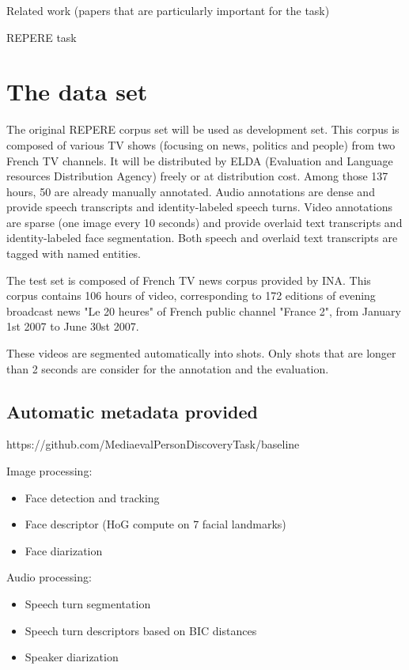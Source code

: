 \documentclass{acm_proc_article-me}
\begin{document}
Related work (papers that are particularly important for the task)

REPERE task


\section{The data set}

The original REPERE corpus set will be used as development set. This corpus is composed of various TV shows (focusing on news, politics and people) from two French TV channels. It will be distributed by ELDA (Evaluation and Language resources Distribution Agency) freely or at distribution cost. Among those 137 hours, 50 are already manually annotated. Audio annotations are dense and provide speech transcripts and identity-labeled speech turns. Video annotations are sparse (one image every 10 seconds) and provide overlaid text transcripts and identity-labeled face segmentation. Both speech and overlaid text transcripts are tagged with named entities.

The test set is composed of French TV news corpus provided by INA. This corpus contains 106 hours of video, corresponding to 172 editions of evening broadcast news "Le 20 heures" of French public channel "France 2", from January 1st 2007 to June 30st 2007.

These videos are segmented automatically into shots. Only shots that are longer than 2 seconds are consider for the annotation and the evaluation.

\subsection{Automatic metadata provided}

https://github.com/MediaevalPersonDiscoveryTask/baseline

Image processing:
\begin{itemize}
\item Face detection and tracking
\item Face descriptor (HoG compute on 7 facial landmarks)
\item Face diarization
\end{itemize}

Audio processing:
\begin{itemize}
\item Speech turn segmentation
\item Speech turn descriptors based on BIC distances
\item Speaker diarization
\end{itemize}
\end{document}
